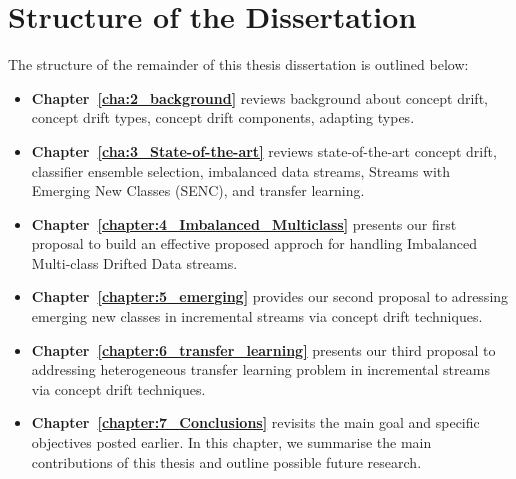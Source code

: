 
\section{Structure of the Dissertation}
\label{sec:1_introduction_organizations}
The structure of the remainder of this thesis dissertation is outlined below:
\begin{itemize}	
	\setlength{\itemsep}{2pt}
    \setlength{\parskip}{2pt}
	\item \textbf{Chapter~\ref{cha:2_background}} reviews background about concept drift, concept drift types, concept drift components, adapting types.  
	\item \textbf{Chapter~\ref{cha:3_State-of-the-art}} reviews state-of-the-art  concept drift, classifier ensemble selection, imbalanced data streams, Streams with Emerging New Classes (SENC), and transfer learning.  
	\item \textbf{Chapter~\ref{chapter:4_Imbalanced_Multiclass}
	} presents our first proposal to build an effective proposed approch for  handling Imbalanced Multi-class Drifted Data streams.
	\item \textbf{Chapter~\ref{chapter:5_emerging}} provides our second proposal to adressing emerging new classes in incremental streams via concept drift techniques. 
	\item \textbf{Chapter~\ref{chapter:6_transfer_learning}} presents our third proposal to addressing heterogeneous transfer learning problem  in incremental streams via concept drift techniques.
	
	\item \textbf{Chapter~\ref{chapter:7_Conclusions}} revisits the main goal and specific objectives posted earlier. In this chapter, we summarise the main contributions of this thesis and outline possible future research.


\end{itemize}